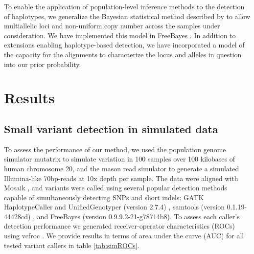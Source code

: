 \documentclass{article}
\begin{document}
To enable the application of population-level inference methods to the detection of haplotypes, we generalize the Bayesian statistical method described by \citet{marth99} to allow multiallelic loci and non-uniform copy number across the samples under consideration.  We have implemented this model in FreeBayes \citep{freebayesgit}.  In addition to extensions enabling haplotype-based detection, we have incorporated a model of the capacity for the alignments to characterize the locus and alleles in question into our prior probability.


\section{Results}

\subsection{Small variant detection in simulated data}
\label{sec:simulation}


To assess the performance of our method, we used the population genome simulator mutatrix \citep{mutatrixgit} to simulate variation in 100 samples over 100 kilobases of human chromosome 20, and the mason read simulator \citep{holtgrewe2010} to generate a simulated Illumina-like 70bp-reads at 10x depth per sample.
The data were aligned with Mosaik \citep{mosaik}, and variants were called using several popular detection methods capable of simultaneously detecting SNPs and short indels: GATK HaplotypeCaller and UnifiedGenotyper (version 2.7.4) \citep{gatk2011}, samtools (version 0.1.19-44428cd) \citep{samtools}, and FreeBayes (version 0.9.9.2-21-g78714b8).
To assess each caller's detection performance we generated receiver-operator characteristics (ROCs) using vcfroc \citep{vcflibgit}.  We provide results in terms of area under the curve (AUC) for all tested variant callers in table \ref{tab:simROCs}.%
\end{document}
